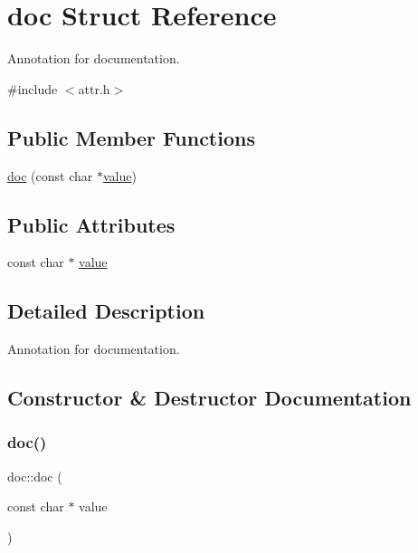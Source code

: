 \hypertarget{structdoc}{}\section{doc Struct Reference}
\label{structdoc}


Annotation for documentation.  




{\ttfamily \#include $<$attr.\+h$>$}

\subsection*{Public Member Functions}
\begin{DoxyCompactItemize}
\item 
\mbox{\hyperlink{structdoc_a6240bc454590bc1e217125271b401c08}{doc}} (const char $\ast$\mbox{\hyperlink{_s_d_l__opengl__glext_8h_a8ad81492d410ff2ac11f754f4042150f}{value}})
\end{DoxyCompactItemize}
\subsection*{Public Attributes}
\begin{DoxyCompactItemize}
\item 
const char $\ast$ \mbox{\hyperlink{structdoc_a31cf9e16020b36cd9bdbff3680aca533}{value}}
\end{DoxyCompactItemize}


\subsection{Detailed Description}
Annotation for documentation. 

\subsection{Constructor \& Destructor Documentation}
\mbox{\label{structdoc_a6240bc454590bc1e217125271b401c08}} 
\subsubsection{\texorpdfstring{doc()}{doc()}}
{\footnotesize\ttfamily doc\+::doc (\begin{DoxyParamCaption}\item[{const char $\ast$}]{value }\end{DoxyParamCaption})\hspace{0.3cm}{\ttfamily [inline]}}



